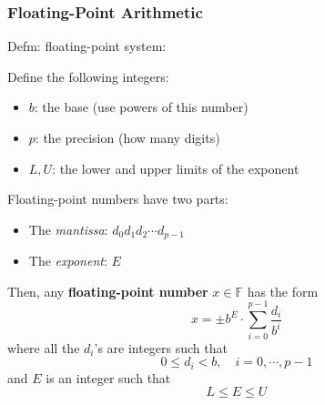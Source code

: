 \documentclass{beamer}
\begin{document}
\begin{frame}	
	\frametitle{Floating-Point Arithmetic}
	
	\begin{alertblock}{Defm: floating-point system:}
		
		
			Define the following integers:
			\begin{itemize}
				\item $b$: the base (use powers of this number)
				\item $p$: the precision (how many digits)
				\item $L,U$: the lower and upper limits of the exponent
			\end{itemize}
			
			\vspace{10pt}
			
			Floating-point numbers have two parts:
			\begin{itemize}
				\item The \emph{mantissa}: $d_0d_1d_2\cdots d_{p-1}$
				\item The \emph{exponent}: $E$
			\end{itemize}
		\endminipage\hfill		
		\endminipage\hfill		
			Then, any \textbf{floating-point number} $x\in\mathbb{F}$ has the form		
			\begin{equation*}
				x = \pm b^E \cdot\sum_{i=0}^{p-1} \frac{d_i}{b^i}
			\end{equation*}
			where all the $d_i$'s are integers such that
			\begin{equation*}
				0 \le d_i < b, \quad i = 0, \cdots, p-1
			\end{equation*}
			and $E$ is an integer such that
			\begin{equation*}
				L \le E \le U
			\end{equation*}
		\endminipage\hfill
	\end{alertblock}
	
\end{frame}
\end{document}
